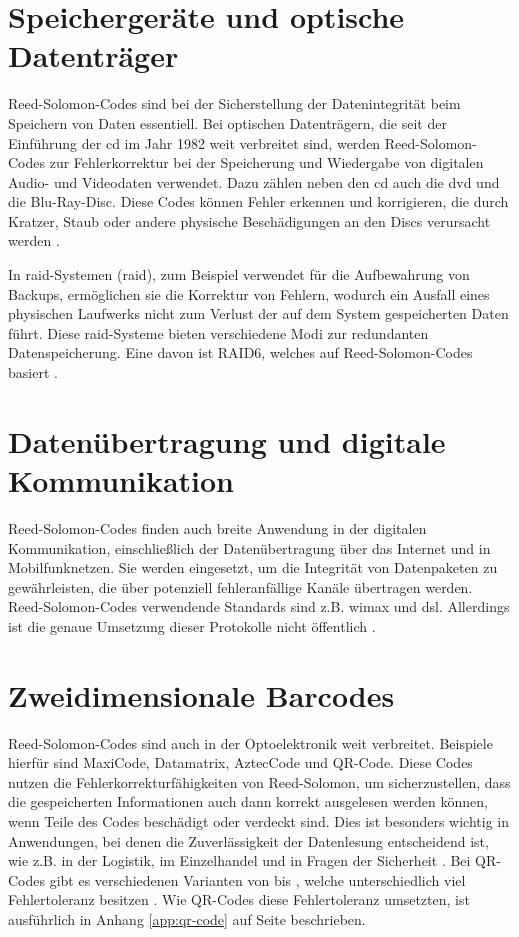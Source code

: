 \section{Speichergeräte und optische Datenträger}

Reed-Solomon-Codes sind bei der Sicherstellung der Datenintegrität beim Speichern von Daten essentiell. 
Bei optischen Datenträgern, die seit der Einführung der \acrfull{cd} im Jahr 1982 weit verbreitet sind, werden Reed-Solomon-Codes zur Fehlerkorrektur bei der Speicherung und Wiedergabe von digitalen Audio- und Videodaten verwendet. Dazu zählen neben den \acrshort{cd} auch die \acrfull{dvd} und die Blu-Ray-Disc. 
Diese Codes können Fehler erkennen und korrigieren, die durch Kratzer, Staub oder andere physische Beschädigungen an den Discs verursacht werden \cite{changReedSolomonProductCodeRSPC1998}. 

In \acrshort{raid}-Systemen (\acrlong{raid}), zum Beispiel verwendet für die Aufbewahrung von Backups, ermöglichen sie die Korrektur von Fehlern, wodurch ein Ausfall eines physischen Laufwerks nicht zum Verlust der auf dem System gespeicherten Daten führt.
Diese \acrshort{raid}-Systeme bieten verschiedene Modi zur redundanten Datenspeicherung.
Eine davon ist RAID6, welches auf Reed-Solomon-Codes basiert \cite{RAIDStorageTechnology2021}.

\section{Datenübertragung und digitale Kommunikation}

Reed-Solomon-Codes finden auch breite Anwendung in der digitalen Kommunikation, einschließlich der Datenübertragung über das Internet und in Mobilfunknetzen. 
Sie werden eingesetzt, um die Integrität von Datenpaketen zu gewährleisten, die über potenziell fehleranfällige Kanäle übertragen werden. 
Reed-Solomon-Codes verwendende Standards sind z.B. \acrshort{wimax} und \acrshort{dsl}.
Allerdings ist die genaue Umsetzung dieser Protokolle nicht öffentlich \cite{vermillionEndtoEndDSLArchitectures2003}.

\section{Zweidimensionale Barcodes}

Reed-Solomon-Codes sind auch in der Optoelektronik weit verbreitet. Beispiele hierfür sind MaxiCode, Datamatrix, AztecCode und QR-Code. 
Diese Codes nutzen die Fehlerkorrekturfähigkeiten von Reed-Solomon, um sicherzustellen, dass die gespeicherten Informationen auch dann korrekt ausgelesen werden können, wenn Teile des Codes beschädigt oder verdeckt sind. 
Dies ist besonders wichtig in Anwendungen, bei denen die Zuverlässigkeit der Datenlesung entscheidend ist, wie z.B. in der Logistik, im Einzelhandel und in Fragen der Sicherheit \cite{tiwariIntroductionQRCode2016}.
Bei QR-Codes gibt es verschiedenen Varianten von  bis , welche unterschiedlich viel Fehlertoleranz besitzen \cite{QRCode2024}.
Wie QR-Codes diese Fehlertoleranz umsetzten, ist ausführlich in Anhang \ref{app:qr-code} auf Seite \pageref{app:qr-code} beschrieben.